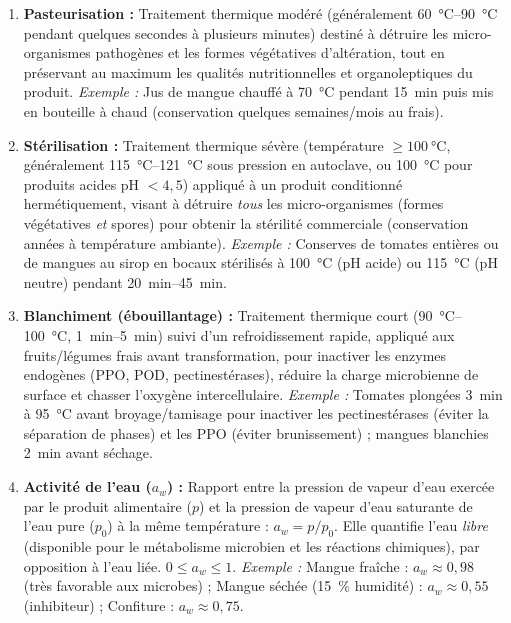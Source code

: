 \documentclass[11pt]{article}
\newcommand{\cle}[1]{{\popxbold\color{popdark}#1}}
\begin{document}
\begin{corrige}
\begin{enumerate}
\item \textbf{Pasteurisation :} Traitement thermique modéré (généralement \SI{60}{\degreeCelsius}--\SI{90}{\degreeCelsius} pendant quelques secondes à plusieurs minutes) destiné à détruire les micro-organismes pathogènes et les formes végétatives d'altération, tout en préservant au maximum les qualités nutritionnelles et organoleptiques du produit.
\emph{Exemple :} Jus de mangue chauffé à \SI{70}{\degreeCelsius} pendant \SI{15}{\minute} puis mis en bouteille à chaud (conservation quelques semaines/mois au frais).

\item \textbf{Stérilisation :} Traitement thermique sévère (température $\ge \SI{100}{\degreeCelsius}$, généralement \SI{115}{\degreeCelsius}--\SI{121}{\degreeCelsius} sous pression en autoclave, ou \SI{100}{\degreeCelsius} pour produits acides pH $< 4,5$) appliqué à un produit conditionné hermétiquement, visant à détruire \emph{tous} les micro-organismes (formes végétatives \emph{et} spores) pour obtenir la \cle{stérilité commerciale} (conservation années à température ambiante).
\emph{Exemple :} Conserves de tomates entières ou de mangues au sirop en bocaux stérilisés à \SI{100}{\degreeCelsius} (pH acide) ou \SI{115}{\degreeCelsius} (pH neutre) pendant \SI{20}{\minute}--\SI{45}{\minute}.

\item \textbf{Blanchiment (ébouillantage) :} Traitement thermique court (\SI{90}{\degreeCelsius}--\SI{100}{\degreeCelsius}, \SI{1}{\minute}--\SI{5}{\minute}) suivi d'un refroidissement rapide, appliqué aux fruits/légumes frais avant transformation, pour inactiver les enzymes endogènes (PPO, POD, pectinestérases), réduire la charge microbienne de surface et chasser l'oxygène intercellulaire.
\emph{Exemple :} Tomates plongées \SI{3}{\minute} à \SI{95}{\degreeCelsius} avant broyage/tamisage pour inactiver les pectinestérases (éviter la séparation de phases) et les PPO (éviter brunissement) ; mangues blanchies \SI{2}{\minute} avant séchage.

\item \textbf{Activité de l'eau ($a_w$) :} Rapport entre la pression de vapeur d'eau exercée par le produit alimentaire ($p$) et la pression de vapeur d'eau saturante de l'eau pure ($p_0$) à la même température : $a_w = p / p_0$. Elle quantifie l'eau \emph{libre} (disponible pour le métabolisme microbien et les réactions chimiques), par opposition à l'eau liée. $0 \le a_w \le 1$.
\emph{Exemple :} Mangue fraîche : $a_w \approx 0,98$ (très favorable aux microbes) ; Mangue séchée (\SI{15}{\%} humidité) : $a_w \approx 0,55$ (inhibiteur) ; Confiture : $a_w \approx 0,75$.


\end{enumerate}
\end{corrige}
\end{document}
